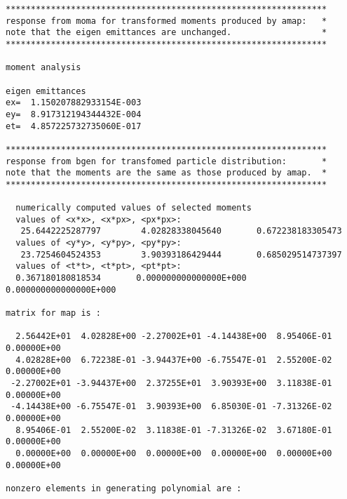 \begin{footnotesize}
\begin{verbatim}
****************************************************************
response from moma for transformed moments produced by amap:   *
note that the eigen emittances are unchanged.                  *
****************************************************************

moment analysis

eigen emittances
ex=  1.150207882933154E-003
ey=  8.917312194344432E-004
et=  4.857225732735060E-017

****************************************************************
response from bgen for transfomed particle distribution:       *
note that the moments are the same as those produced by amap.  *
****************************************************************

  numerically computed values of selected moments
  values of <x*x>, <x*px>, <px*px>:
   25.6442225287797        4.02828338045640       0.672238183305473
  values of <y*y>, <y*py>, <py*py>:
   23.7254604524353        3.90393186429444       0.685029514737397
  values of <t*t>, <t*pt>, <pt*pt>:
  0.367180180818534       0.000000000000000E+000  0.000000000000000E+000

matrix for map is :

  2.56442E+01  4.02828E+00 -2.27002E+01 -4.14438E+00  8.95406E-01  0.00000E+00
  4.02828E+00  6.72238E-01 -3.94437E+00 -6.75547E-01  2.55200E-02  0.00000E+00
 -2.27002E+01 -3.94437E+00  2.37255E+01  3.90393E+00  3.11838E-01  0.00000E+00
 -4.14438E+00 -6.75547E-01  3.90393E+00  6.85030E-01 -7.31326E-02  0.00000E+00
  8.95406E-01  2.55200E-02  3.11838E-01 -7.31326E-02  3.67180E-01  0.00000E+00
  0.00000E+00  0.00000E+00  0.00000E+00  0.00000E+00  0.00000E+00  0.00000E+00

nonzero elements in generating polynomial are :


\end{verbatim}
\end{footnotesize}
